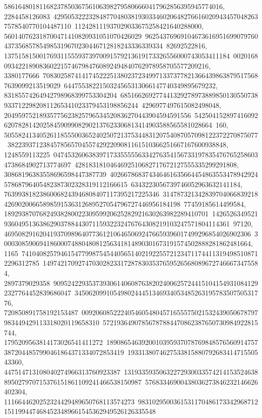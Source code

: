 {{{58616480181168237850367561063982795806660417962856395945774016, 2284458126083\
42950532223284877048038193033460206482766160209434570482637578540770104487110\
112428111937029033675258421640288000, 560140762318700471410820931051070426029\
96254376969104673616951699079760437356857854985319670230446712818243336339334\
82692522816, 1375158150017693115559373970091579213619173326556000743053411184\
00201680934221890836022157467984760892494840762978958705577209216, 3380177666\
70830258741417452225138023723499713373778213664398638795175687639099213519029\
6447553822150324565313066147740349895679232, 83185574264942798968399753304204\
68516626927744132927897388985013055073893371229820811265341023379453198856244\
4296977497615082498048, 20495975218935775623825796534520836270443904594591556\
54250415289741609262078281420258459099082902137623306813414903588565581028664\
160, 505582413405261185550036524025072137534483120754087057098122372270875077\
38223937123845785657045574292209081161510366251667167600938848, 1248559113225\
04745326063839717335555563342763541567331978354767652586034738684902713774697\
4281831810464692510682717672127555335299291808, 30868196383558696598447387739\
40266786837434646163566445486355347894292457868796405482387302328319112166615\
6343223056739746052963632141184, 76399381823860068243946808407117395217225346\
31478732134283970406683921842690200665898591536312689527054796727446956184198\
77459185614499584, 1892938707682493828002230959920625282921630263982289410701\
14265263495219360495136386290378844307115932232476764308219103247571804114361\
97120, 4695082916204193709896407736121064650692476659396017499296854026902306\
30003085906941860007488048081256341814890301673191574502888281862481664, 1165\
74104082579461547799875454405651402192255721234711744113194985108712296312785\
14974217092747030282331728783035376595265680896727466673475584, 2897379029358\
90952422935373930614060876382024006257244151041549310841292327764452839686047\
345062099105498024445134693405348526319578350750531776, 720850891758192153487\
00920608522240546054804571655575021532439050678797983449429113318020119658310\
57219364907856787884470862387650730984922815744, 1795209563814173026541411272\
18908654639200103959370787698485765609147573872044857990461864371334072853419\
193313807462753381588079268341471550543360, 447514713108040274966313760923387\
13193359350632272930033574214153524638895027970715376151861109241466538150987\
57683346900438036273846232146626402304, 1116644620252324429489650768113574273\
98310295003615311704861733429687121511994474684523489661545362949526126335548\
}}}
